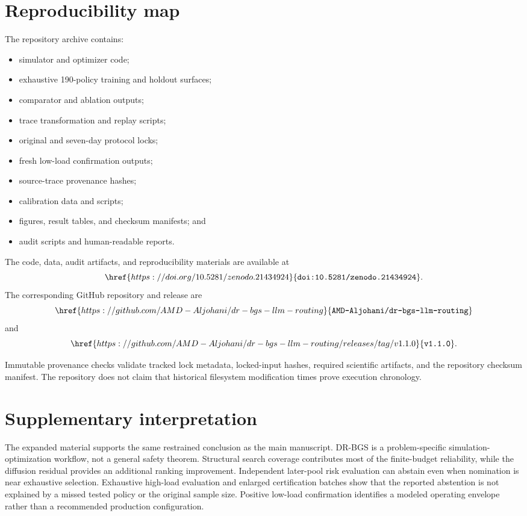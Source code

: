 \documentclass[futureinternet,supfile,submit,moreauthors]{Definitions/mdpi}
\begin{document}
\section{Reproducibility map}
\label{sec:reproducibility}

The repository archive contains:

\begin{itemize}
\item simulator and optimizer code;
\item exhaustive 190-policy training and holdout surfaces;
\item comparator and ablation outputs;
\item trace transformation and replay scripts;
\item original and seven-day protocol locks;
\item fresh low-load confirmation outputs;
\item source-trace provenance hashes;
\item calibration data and scripts;
\item figures, result tables, and checksum manifests; and
\item audit scripts and human-readable reports.
\end{itemize}

The code, data, audit artifacts, and reproducibility materials are available
at
\[
\href{https://doi.org/10.5281/zenodo.21434924}
{\texttt{doi:10.5281/zenodo.21434924}}.
\]
The corresponding GitHub repository and release are
\[
\href{https://github.com/AMD-Aljohani/dr-bgs-llm-routing}
{\texttt{AMD-Aljohani/dr-bgs-llm-routing}}
\]
and
\[
\href{https://github.com/AMD-Aljohani/dr-bgs-llm-routing/releases/tag/v1.1.0}
{\texttt{v1.1.0}}.
\]

Immutable provenance checks validate tracked lock metadata, locked-input
hashes, required scientific artifacts, and the repository checksum manifest.
The repository does not claim that historical filesystem modification times
prove execution chronology.

\section{Supplementary interpretation}

The expanded material supports the same restrained conclusion as the main
manuscript. DR-BGS is a problem-specific simulation-optimization workflow,
not a general safety theorem. Structural search coverage contributes most of
the finite-budget reliability, while the diffusion residual provides an
additional ranking improvement. Independent later-pool risk evaluation can
abstain even when nomination is near exhaustive selection. Exhaustive
high-load evaluation and enlarged certification batches show that the
reported abstention is not explained by a missed tested policy or the
original sample size. Positive low-load confirmation identifies a modeled
operating envelope rather than a recommended production configuration.

\PublishersNote{}
\end{document}
